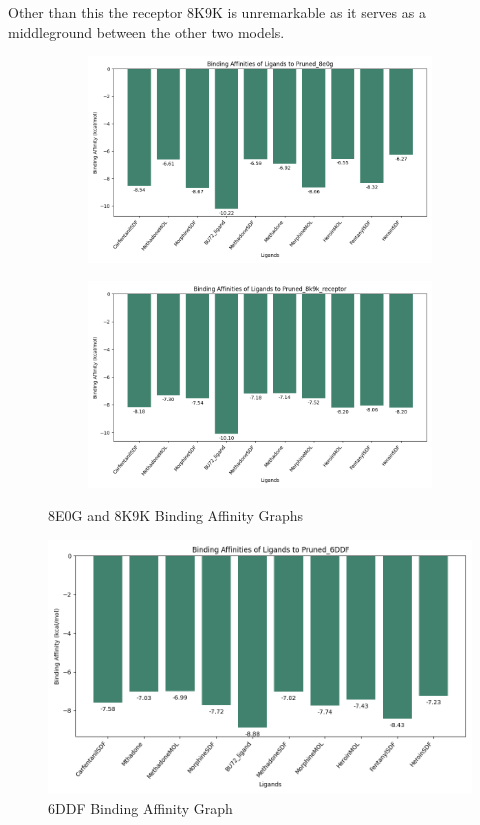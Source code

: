 \documentclass[a4paper,10pt]{article}
\begin{document}
Other than this the receptor 8K9K is unremarkable as it serves as a middleground between the other two models.



\begin{figure}[H]
    \centering
    \begin{subfigure}{0.45\textwidth}
        \centering
        \includegraphics[width=\linewidth]{imgs/Pruned_8e0g_affinities.png}
        \label{fig:image1}
    \end{subfigure}
    \hfill
    \begin{subfigure}{0.45\textwidth}
        \centering
        \includegraphics[width=\linewidth]{imgs/Pruned_8k9k_receptor_affinities.png}
        \label{fig:image2}
    \end{subfigure}
    \caption{8E0G and 8K9K Binding Affinity Graphs}
    \label{fig:comparison}
\end{figure}

\begin{figure}[H]
    \centering
    \includegraphics[width=0.5\linewidth]{imgs/Pruned_6DDF_affinities.png}
    \caption{6DDF Binding Affinity Graph}
    \label{fig:enter-label}
\end{figure}
\end{document}
